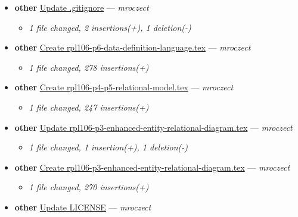 \begin{itemize}[leftmargin=1.5em]
  \begin{itemize}[leftmargin=1.5em]
    \item \small\textit{1 file changed, 25 insertions(+), 2 deletions(-)}
  \end{itemize}
  \item \textbf{other} \href{https://github.com/mroczect/mroczect.github.io/commit/d309bcd197b65d75ba8b87489330202dae0e4627}{Update .gitignore} --- \textit{mroczect}
  \begin{itemize}[leftmargin=1.5em]
    \item \small\textit{1 file changed, 2 insertions(+), 1 deletion(-)}
  \end{itemize}
  \item \textbf{other} \href{https://github.com/mroczect/mroczect.github.io/commit/c8c932a6307a6e44fae98926132df9ad7229c742}{Create rpl106-p6-data-definition-language.tex} --- \textit{mroczect}
  \begin{itemize}[leftmargin=1.5em]
    \item \small\textit{1 file changed, 278 insertions(+)}
  \end{itemize}
  \item \textbf{other} \href{https://github.com/mroczect/mroczect.github.io/commit/3f74617719d609d1e1f6fa943216132f539e70b9}{Create rpl106-p4-p5-relational-model.tex} --- \textit{mroczect}
  \begin{itemize}[leftmargin=1.5em]
    \item \small\textit{1 file changed, 247 insertions(+)}
  \end{itemize}
  \item \textbf{other} \href{https://github.com/mroczect/mroczect.github.io/commit/e55fe543b9fe77e2b1e2347fce0d7d1e4bb211f0}{Update rpl106-p3-enhanced-entity-relational-diagram.tex} --- \textit{mroczect}
  \begin{itemize}[leftmargin=1.5em]
    \item \small\textit{1 file changed, 1 insertion(+), 1 deletion(-)}
  \end{itemize}
  \item \textbf{other} \href{https://github.com/mroczect/mroczect.github.io/commit/4eb4b1966c62ddce277a881ec5551f77d9ed3d53}{Create rpl106-p3-enhanced-entity-relational-diagram.tex} --- \textit{mroczect}
  \begin{itemize}[leftmargin=1.5em]
    \item \small\textit{1 file changed, 270 insertions(+)}
  \end{itemize}
  \item \textbf{other} \href{https://github.com/mroczect/mroczect.github.io/commit/c9b46d3c9814b2e0ba33af5340000ca10e0917e4}{Update LICENSE} --- \textit{mroczect}

\end{itemize}
